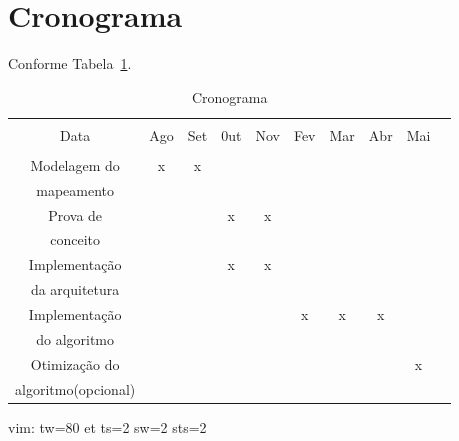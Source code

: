 \section{Cronograma}

Conforme Tabela~\ref{tab:crono}.
\begin{table}[Ht!]
   \begin{center}
     \begin{tabular}{|c|c|c|c|c|c|c|c|c|c|}
       \hline
                         &      &     &     &     &     &     &     &         \\
           Data          &  Ago & Set & 0ut & Nov & Fev & Mar & Abr & Mai      \\
                         &      &     &     &     &     &     &     &         \\
       \hline                                                                 
       Modelagem do      &   x  &  x  &     &     &     &     &     &         \\
       mapeamento        &      &     &     &     &     &     &     &         \\
       \hline                                                                 
       Prova de          &      &     &  x  &  x  &     &     &     &         \\
       conceito          &      &     &     &     &     &     &     &         \\
       \hline                                                                 
       Implementação     &      &     &  x  &  x  &     &     &     &         \\
       da arquitetura    &      &     &     &     &     &     &     &         \\
       \hline                                                                 
       Implementação     &      &     &     &     &  x  &  x  &  x  &         \\
       do algoritmo      &      &     &     &     &     &     &     &         \\
       \hline                                                                 
       Otimização do     &      &     &     &     &     &     &     &   x     \\
       algoritmo(opcional)&      &     &     &     &     &     &     &         \\
       \hline
     \end{tabular}
   \caption{Cronograma}
   \label{tab:crono}
   \end{center}
 \end{table}

 vim: tw=80 et ts=2 sw=2 sts=2
